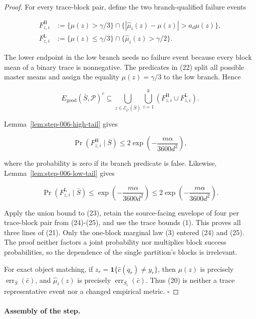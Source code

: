 \begin{proof}
For every trace-block pair, define the two branch-qualified
failure events

\[
\begin{aligned}
 F^{\mathrm H}_{z,i}
 &:=\{\mu(z)>\gamma/3\}
   \cap\{|\widehat\mu_i(z)-\mu(z)|>a_d\mu(z)\},\\
 F^{\mathrm L}_{z,i}
 &:=\{\mu(z)\leq\gamma/3\}
   \cap\{\widehat\mu_i(z)>\gamma/2\}.
\end{aligned}
\tag{22}
\]

The lower endpoint in the low branch needs no failure event because every
block mean of a binary trace is nonnegative.  The predicates in (22) split
all possible master means and assign the equality
\(\mu(z)=\gamma/3\) to the low branch.  Hence

\[
 E_{\mathrm{good}}(\bar S,\mathcal P)^c
 \subseteq
 \bigcup_{z\in\mathcal E_{\bar C}(\bar S)}
 \bigcup_{i=1}^k
 \left(F^{\mathrm H}_{z,i}\cup F^{\mathrm L}_{z,i}\right).
\tag{23}
\]

Lemma~\ref{lem:step-006-high-tail} gives

\[
 \Pr(F^{\mathrm H}_{z,i}\mid\bar S)
 \leq2\exp\!\left(-\frac{m\alpha}{3600d^2}\right),
\tag{24}
\]

where the probability is zero if its branch predicate is false.  Likewise,
Lemma~\ref{lem:step-006-low-tail} gives

\[
 \Pr(F^{\mathrm L}_{z,i}\mid\bar S)
 \leq\exp\!\left(-\frac{m\alpha}{3600d^2}\right)
 \leq2\exp\!\left(-\frac{m\alpha}{3600d^2}\right).
\tag{25}
\]

Apply the union bound to (23), retain the source-facing envelope of four
per trace-block pair from (24)-(25), and use the  trace bounds (1).
This proves all three lines of (21).  Only the one-block marginal law (3)
entered (24) and (25).  The proof neither factors a joint probability nor
multiplies block success probabilities, so the dependence of the single
partition's blocks is irrelevant.

For exact object matching, if
\(z_r=\mathbf1\{\bar c(q_r)\ne y_r\}\), then \(\mu(z)\) is precisely
\(\operatorname{err}_{\bar S}(\bar c)\), and
\(\widehat\mu_i(z)\) is precisely
\(\operatorname{err}_{\bar S_i}(\bar c)\).  Thus (20) is neither a trace
representative event nor a changed empirical metric. \(\square\)


\end{proof}

\paragraph{Assembly of the step.}


